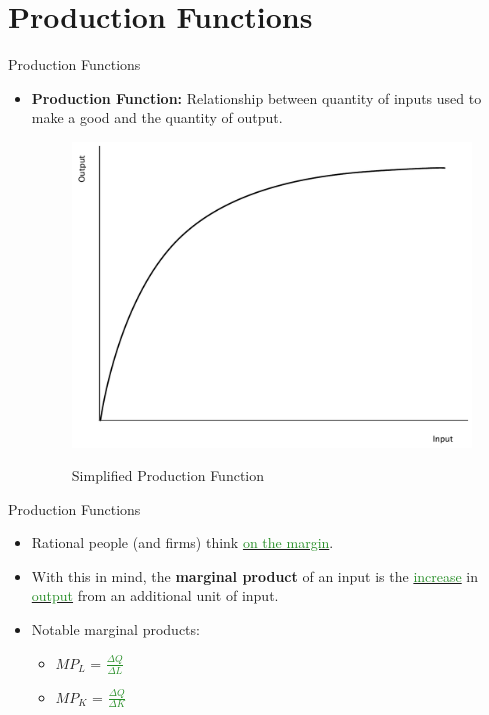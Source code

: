 \documentclass[xcolor={dvipsnames},pdf, hyperref={colorlinks=true, citecolor=ForestGreen, linkcolor=BlueViolet, urlcolor=Magenta}]{beamer}
\newcommand{\defn}[1]{\textbf{#1}}
\newcommand{\blank}[0]{}
\newcommand{\ddp}[1]{{\textcolor{ForestGreen}{#1}}}
\newcommand{\dd}[1]{{\underline{\textcolor{ForestGreen}{#1}}}}
\begin{document}
\section{Production Functions}

\begin{frame}{Production Functions}
\begin{itemize}
	\item \defn{Production Function:} Relationship between quantity of inputs used to make a good and the quantity of output.
	\blank \blank \blank \blank \blank
	\begin{figure}[H]
		\centering
		\ddp{\includegraphics[scale=.30]{plot54.pdf}}
		\caption{Simplified Production Function}
	\end{figure}

\end{itemize}
\end{frame}

\begin{frame}{Production Functions}
\begin{itemize}
	\item Rational people (and firms) think \dd{on the margin}. 
	\item With this in mind, the \defn{marginal product} of an input is the \dd{increase} in \dd{output} from an additional unit of input. 
	\item Notable marginal products:
	\begin{itemize}
		\item 	$MP_L$ = \ddp{$\frac{\Delta Q}{\Delta L}$} 
		\item  	$MP_K$ = \ddp{$\frac{\Delta Q}{\Delta K}$} 
	\end{itemize}


\end{itemize}
\end{frame}
\end{document}
